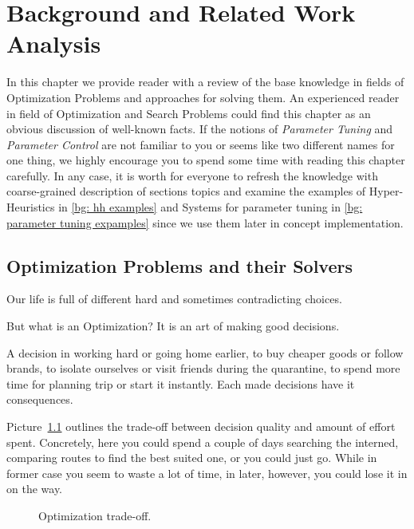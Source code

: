 \chapter{Background and Related Work Analysis}\label{bg}
In this chapter we provide reader with a review of the base knowledge in fields of Optimization Problems and approaches for solving them.
An experienced reader in field of Optimization and Search Problems could find this chapter as an obvious discussion of well-known facts. 
If the notions of \textit{Parameter Tuning} and \textit{Parameter Control} are not familiar to you or seems like two different names for one thing, we highly encourage you to spend some time with reading this chapter carefully.
In any case, it is worth for everyone to refresh the knowledge with coarse-grained description of sections topics and examine the examples of Hyper-Heuristics in \ref{bg: hh examples} and Systems for parameter tuning in \ref{bg: parameter tuning expamples} since we use them later in concept implementation.


\section{Optimization Problems and their Solvers}\label{bg:opt problems and solvers}
Our life is full of different hard and sometimes contradicting choices. 

But what is an Optimization? It is an art of making good decisions.

A decision in working hard or going home earlier, to buy cheaper goods or follow brands, to isolate ourselves or visit friends during the quarantine, to spend more time for planning trip or start it instantly. Each made decisions have it consequences.

Picture~\ref{bg:pic:Optimization tradeoff} outlines the trade-off between decision quality and amount of effort spent. Concretely, here you could spend a couple of days searching the interned, comparing routes to find the best suited one, or you could just go. While in former case you seem to waste a lot of time, in later, however, you could lose it in on the way.

\begin{figure}
	\centering
	
	\caption{Optimization trade-off.}
	\label{bg:pic:Optimization tradeoff}
\end{figure}

